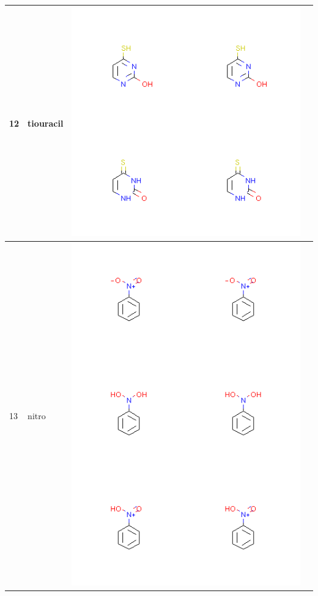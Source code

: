 \begin{longtable}{|l|l|l|l|}
\hline
12 & tiouracil & \includegraphics[scale=0.6]{tiouracil.png} & \\
\hline
13 & nitro & \includegraphics[scale=0.6]{nitro.png} & \\

\end{longtable}
